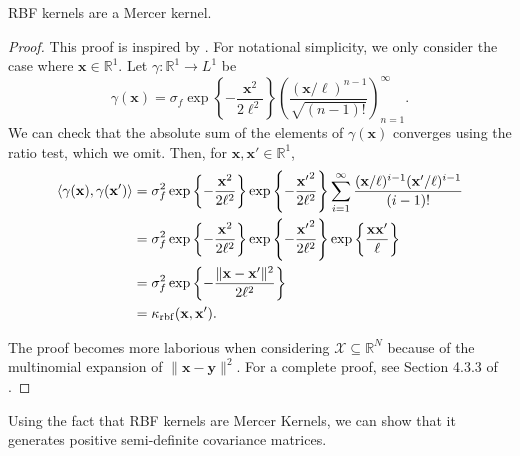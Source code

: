 \begin{theorem}
    \label{thm:rbf-mercer}
    RBF kernels are a Mercer kernel.
\end{theorem}
\begin{proof}
    This proof is inspired by \cite{shashua2009}.
    For notational simplicity, we only consider the case where $\mathbf{x} \in \mathbb{R}^{1}$.
    Let $\gamma : \mathbb{R}^{1} \to L^1$ be
    \begin{equation*}
        \gamma(\mathbf{x}) = \sigma_f \exp\left\{- \frac{\mathbf{x}^2}{2\ell^2}\right\} \left(\frac{ (\mathbf{x} / \ell)^{n - 1} }{ \sqrt{(n - 1)!} }\right)_{n=1}^{\infty}.
    \end{equation*}
    We can check that the absolute sum of the elements of $\gamma(\mathbf{x})$ converges using the ratio test, which we omit.
    Then, for $\mathbf{x}, \mathbf{x'} \in \mathbb{R}^{1}$,
    \begin{align*}
        \langle \gamma(\mathbf{x}), \gamma(\mathbf{x'}) \rangle
        & = \sigma_f^2
        \exp \left\{ -\frac{\mathbf{x}^2}{2\ell^2} \right\}
        \exp \left\{ -\frac{ \mathbf{x'}^2}{2\ell^2} \right\}
        \sum\limits_{i=1}^{\infty}
        \frac{ (\mathbf{x}/\ell)^{i - 1} (\mathbf{x'}/\ell)^{i - 1}}{ (i - 1)! } \\
        & = \sigma_f^2
        \exp \left\{ -\frac{ \mathbf{x}^2}{2\ell^2} \right\}
        \exp \left\{ -\frac{ \mathbf{x'}^2}{2\ell^2} \right\}
        \exp \left\{ \frac{\mathbf{x} \mathbf{x'}}{ \ell} \right\} \\
        & = \sigma_f^2 \exp \left\{ -\frac{ \lVert \mathbf{x} - \mathbf{x'} \rVert^2 }{ 2\ell^2 } \right\} \\
        & = \kappa_{\mathrm{rbf}}(\mathbf{x}, \mathbf{x'}).
    \end{align*}

    The proof becomes more laborious when considering $\mathcal{X} \subseteq \mathbb{R}^{N}$ because of the multinomial expansion of $\lVert \mathbf{x} - \mathbf{y} \rVert^2$.
    For a complete proof, see Section 4.3.3 of \cite{shashua2009}.
\end{proof}

Using the fact that RBF kernels are Mercer Kernels, we can show that it generates positive semi-definite covariance matrices.

